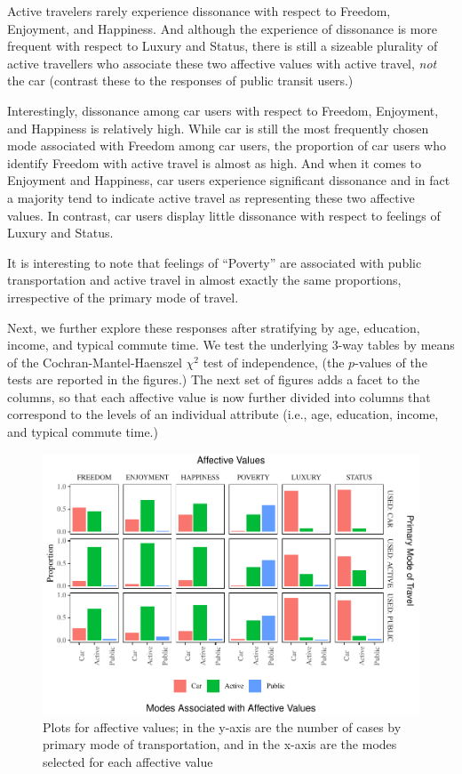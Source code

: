 \documentclass[]{elsarticle} %
\makeatletter
\def\maxwidth{\ifdim\Gin@nat@width>\linewidth\linewidth
\else\Gin@nat@width\fi}
\let\Oldincludegraphics\includegraphics
\renewcommand{\includegraphics}[1]{\Oldincludegraphics[width=\maxwidth]{#1}}
\makeatother
\begin{document}
Active travelers rarely experience dissonance with respect to Freedom,
Enjoyment, and Happiness. And although the experience of dissonance is
more frequent with respect to Luxury and Status, there is still a
sizeable plurality of active travellers who associate these two
affective values with active travel, \emph{not} the car (contrast these
to the responses of public transit users.)

Interestingly, dissonance among car users with respect to Freedom,
Enjoyment, and Happiness is relatively high. While car is still the most
frequently chosen mode associated with Freedom among car users, the
proportion of car users who identify Freedom with active travel is
almost as high. And when it comes to Enjoyment and Happiness, car users
experience significant dissonance and in fact a majority tend to
indicate active travel as representing these two affective values. In
contrast, car users display little dissonance with respect to feelings
of Luxury and Status.

It is interesting to note that feelings of ``Poverty'' are associated
with public transportation and active travel in almost exactly the same
proportions, irrespective of the primary mode of travel.

Next, we further explore these responses after stratifying by age,
education, income, and typical commute time. We test the underlying
3-way tables by means of the Cochran-Mantel-Haenszel \(\chi^2\) test of
independence, (the \(p\)-values of the tests are reported in the
figures.) The next set of figures adds a facet to the columns, so that
each affective value is now further divided into columns that correspond
to the levels of an individual attribute (i.e., age, education, income,
and typical commute time.)

\begin{figure}
\centering
\includegraphics{Dissonance_Santiago_v2_files/figure-latex/figure-bar-plots-by-attribute-1.pdf}
\caption{\label{fig:bar-plots-by-attribute}Plots for affective values;
in the y-axis are the number of cases by primary mode of transportation,
and in the x-axis are the modes selected for each affective value}
\end{figure}
\end{document}
